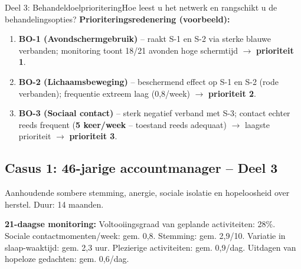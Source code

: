 \documentclass[11pt,a4paper]{article}
\begin{document}
\begin{voorbeeldbox}{Deel 3: Behandeldoelprioritering}{Hoe leest u het netwerk en rangschikt u de behandelingsopties?}
\medskip
\textbf{Prioriteringsredenering (voorbeeld):}
\begin{enumerate}[topsep=2pt,itemsep=1pt,label=\arabic*.]
\item \textbf{BO-1 (Avondschermgebruik)} -- raakt S-1 en S-2 via sterke blauwe verbanden;
monitoring toont 18/21 avonden hoge schermtijd $\rightarrow$ \textbf{prioriteit 1}.
\item \textbf{BO-2 (Lichaamsbeweging)} -- beschermend effect op S-1 en S-2 (rode verbanden);
frequentie extreem laag (0,8/week) $\rightarrow$ \textbf{prioriteit 2}.
\item \textbf{BO-3 (Sociaal contact)} -- sterk negatief verband met S-3; contact echter reeds frequent (\textbf{5 keer/week} -- toestand reeds adequaat) $\rightarrow$ laagste prioriteit $\rightarrow$ \textbf{prioriteit 3}.
\end{enumerate}
\end{voorbeeldbox}

\vspace{0.5em}

\newpage
\subsection*{Casus 1: 46-jarige accountmanager -- Deel 3}

\begin{complaintbox}[title={Casus 1: 46-jarige accountmanager}]
\small Aanhoudende sombere stemming, anergie, sociale isolatie en hopeloosheid over herstel. Duur: 14 maanden.
\end{complaintbox}

\begin{monitorbox}
\small\textbf{21-daagse monitoring:} Voltooiingsgraad van geplande activiteiten: 28\%. Sociale contactmomenten/week: gem. 0,8. Stemming: gem. 2,9/10. Variatie in slaap-waaktijd: gem. 2,3 uur. Plezierige activiteiten: gem. 0,9/dag. Uitdagen van hopeloze gedachten: gem. 0,6/dag.
\end{monitorbox}
\end{document}
